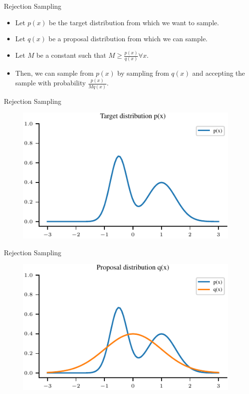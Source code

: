 \documentclass[handout]{beamer}
\begin{document}
    \begin{frame}{Rejection Sampling}
        \begin{itemize}
            \item Let $p(x)$ be the target distribution from which we want to sample.
            \item Let $q(x)$ be a proposal distribution from which we can sample.
            \item Let $M$ be a constant such that $M \geq \frac{p(x)}{q(x)} \forall x$.
            \item Then, we can sample from $p(x)$ by sampling from $q(x)$ and accepting the sample with probability $\frac{p(x)}{M q(x)}$.
        \end{itemize}
        
    \end{frame}

   \begin{frame}{Rejection Sampling}
    \begin{figure}
        \centering
        \includegraphics{notebooks/figures/sampling/rejection-sampling--1.0-False-False-False-False-False-False-False-False.pdf}
    \end{figure}
    
   \end{frame}

    \begin{frame}{Rejection Sampling}
        \begin{figure}
            \centering
            \includegraphics{notebooks/figures/sampling/rejection-sampling--1.0-True-False-False-False-False-False-False-False.pdf}
        \end{figure}
    \end{frame}
\end{document}
